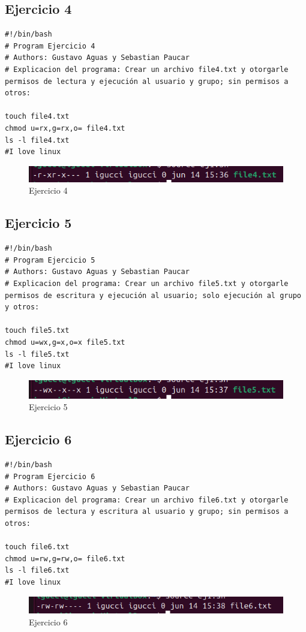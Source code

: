 \documentclass[11pt,twoside]{book}
\begin{document}
\subsection{Ejercicio 4}
\begin{lstlisting}
#!/bin/bash
# Program Ejercicio 4
# Authors: Gustavo Aguas y Sebastian Paucar
# Explicacion del programa: Crear un archivo file4.txt y otorgarle permisos de lectura y ejecución al usuario y grupo; sin permisos a otros:

touch file4.txt
chmod u=rx,g=rx,o= file4.txt
ls -l file4.txt
#I love linux
\end{lstlisting}
\begin{figure}
    \centering
    \includegraphics[width=1\linewidth]{psimb/ej4.png}
    \caption{Ejercicio 4}
\end{figure}
\newpage
\subsection{Ejercicio 5}
\begin{lstlisting}
#!/bin/bash
# Program Ejercicio 5
# Authors: Gustavo Aguas y Sebastian Paucar
# Explicacion del programa: Crear un archivo file5.txt y otorgarle permisos de escritura y ejecución al usuario; solo ejecución al grupo y otros:

touch file5.txt
chmod u=wx,g=x,o=x file5.txt
ls -l file5.txt
#I love linux
\end{lstlisting}
\begin{figure}
    \centering
    \includegraphics[width=1\linewidth]{psimb/ej5.png}
    \caption{Ejercicio 5}
\end{figure}
\newpage
\subsection{Ejercicio 6}

\begin{lstlisting}
#!/bin/bash
# Program Ejercicio 6
# Authors: Gustavo Aguas y Sebastian Paucar
# Explicacion del programa: Crear un archivo file6.txt y otorgarle permisos de lectura y escritura al usuario y grupo; sin permisos a otros:

touch file6.txt
chmod u=rw,g=rw,o= file6.txt
ls -l file6.txt
#I love linux
\end{lstlisting}
\begin{figure}
    \centering
    \includegraphics[width=1\linewidth]{psimb/ej6.png}
    \caption{Ejercicio 6}
\end{figure}
\newpage
\end{document}
